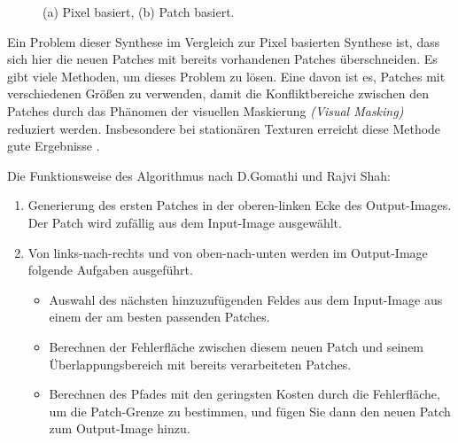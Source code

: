 \documentclass[12pt, a4paper,twoside,openright]{report} %
\begin{document}
\begin{figure}[H]
    \centering
    \qquad
    \caption{(a) Pixel basiert, (b) Patch basiert.}%
\end{figure}

Ein Problem dieser Synthese im Vergleich zur Pixel basierten Synthese ist, dass sich hier die neuen Patches mit bereits vorhandenen Patches überschneiden.
Es gibt viele Methoden, um dieses Problem zu lösen.
Eine davon ist es, Patches mit verschiedenen Größen zu verwenden, damit die Konfliktbereiche zwischen den Patches durch das Phänomen der visuellen Maskierung
\textit{(Visual Masking)} reduziert werden.
Insbesondere bei stationären Texturen erreicht diese Methode gute Ergebnisse \cite{EfrosQuilt}.

Die Funktionsweise des Algorithmus nach D.Gomathi und Rajvi Shah:

\begin{enumerate}
    \item Generierung des ersten Patches in der oberen-linken Ecke des Output-Images. Der Patch wird zufällig aus dem Input-Image ausgewählt.
    \item Von links-nach-rechts und von oben-nach-unten werden im Output-Image folgende Aufgaben ausgeführt.
    \begin{itemize}
        \item Auswahl des nächsten hinzuzufügenden Feldes aus dem Input-Image aus einem der am besten passenden Patches.
        \item Berechnen der Fehlerfläche zwischen diesem neuen Patch und seinem Überlappungsbereich mit bereits
        verarbeiteten Patches.
        \item Berechnen des Pfades mit den geringsten Kosten durch die Fehlerfläche, um die Patch-Grenze zu bestimmen, und fügen Sie dann den neuen Patch zum Output-Image hinzu.
    \end{itemize}
\end{enumerate}
\end{document}
